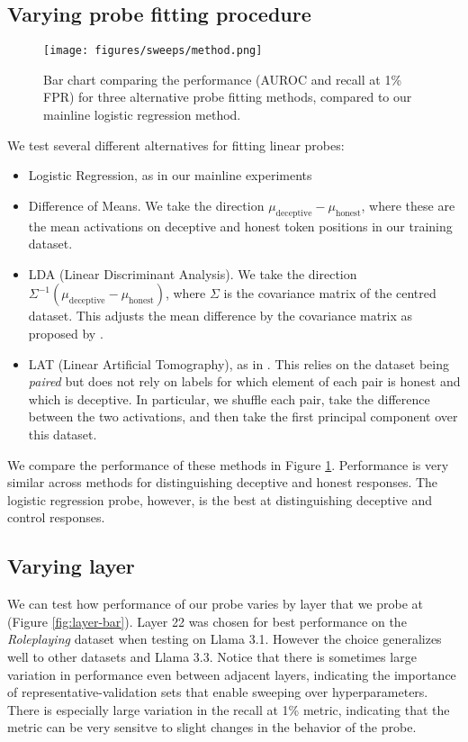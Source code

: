 \documentclass{article}
\begin{document}
\subsection{Varying probe fitting procedure} \label{appx:probe-fitting}

\begin{figure}[h]
  \centering
  \texttt{[image: figures/sweeps/method.png]}
  \caption{Bar chart comparing the performance (AUROC and recall at 1\% FPR) for three alternative probe fitting methods, compared to our mainline logistic regression method.}
  \label{fig:method-bar}
\end{figure}

We test several different alternatives for fitting linear probes:
\begin{itemize}
\item
  Logistic Regression, as in our mainline experiments
\item
  Difference of Means. We take the direction $\mu_{\text{deceptive}} - \mu_{\text{honest}}$, where these are the mean activations on deceptive and honest token positions in our training dataset.
\item
  LDA (Linear Discriminant Analysis). We take the direction $\Sigma^{-1}(\mu_{\text{deceptive}} - \mu_{\text{honest}})$, where $\Sigma$ is the covariance matrix of the centred dataset.
  This adjusts the mean difference by the covariance matrix as proposed by
  \citet{Marks2023_geometry}.
\item
  LAT (Linear Artificial Tomography), as in \citet{Zou2023_repe}.
  This relies on the dataset being \emph{paired} but does not rely on labels for which element of each pair is honest and which is deceptive. 
  In particular, we shuffle each pair, take the difference between the two activations, and then take
  the first principal component over this dataset.
\end{itemize}

We compare the performance of these methods in Figure \ref{fig:method-bar}. Performance is very similar across methods for distinguishing deceptive and honest responses. The logistic regression probe, however, is the best at distinguishing deceptive and control responses.

\subsection{Varying layer} \label{appx:layer}
We can test how performance of our probe varies by layer that we probe
at (Figure \ref{fig:layer-bar}). Layer 22 was chosen for best performance on the \emph{Roleplaying}
dataset when testing on Llama 3.1. However the choice generalizes well to other datasets and Llama 3.3.
Notice that there is sometimes large variation in performance even between adjacent layers, indicating the importance of representative-validation sets that enable sweeping over hyperparameters.
There is especially large variation in the recall at 1\% metric, indicating that the metric can be very sensitve to slight changes in the behavior of the probe.
\end{document}
